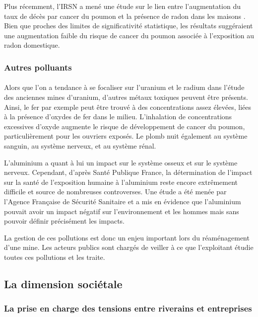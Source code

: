 \documentclass{article}
\begin{document}
Plus récemment, l’IRSN a mené une étude sur le lien entre l’augmentation du taux de décès par cancer du poumon et la présence de radon dans les maisons \cite{darby_radon_2005}. Bien que proches des limites de significativité statistique, les résultats suggéraient une augmentation faible du risque de cancer du poumon associée à l’exposition au radon domestique.

\subsubsection{Autres polluants}

\paragraph{} Alors que l’on a tendance à se focaliser sur l’uranium et le radium dans l’étude des anciennes mines d’uranium, d'autres métaux toxiques peuvent être présents. Ainsi, le fer par exemple peut être trouvé à des concentrations assez élevées, liées à la présence d'oxydes de fer dans le milieu. L'inhalation de concentrations excessives d'oxyde augmente le risque de développement de cancer du poumon, particulièrement pour les ouvriers exposés. Le plomb nuit également au système sanguin, au système nerveux, et au système rénal.

L’aluminium a quant à lui un impact sur le système osseux et sur le système nerveux. Cependant, d’après Santé Publique France, la détermination de l'impact sur la santé de l'exposition humaine à l'aluminium reste encore extrêmement difficile et source de nombreuses controverses. Une étude a été menée par l’Agence Française de Sécurité Sanitaire et a mis en évidence que l’aluminium pouvait avoir un impact négatif sur l’environnement et les hommes mais sans pouvoir définir précisément les impacts.

La gestion de ces pollutions est donc un enjeu important lors du réaménagement d'une mine. Les acteurs publics sont chargés de veiller à ce que l'exploitant étudie toutes ces pollutions et les traite.


\subsection{La dimension sociétale}
\subsubsection{La prise en charge des tensions entre riverains et entreprises}
\end{document}
